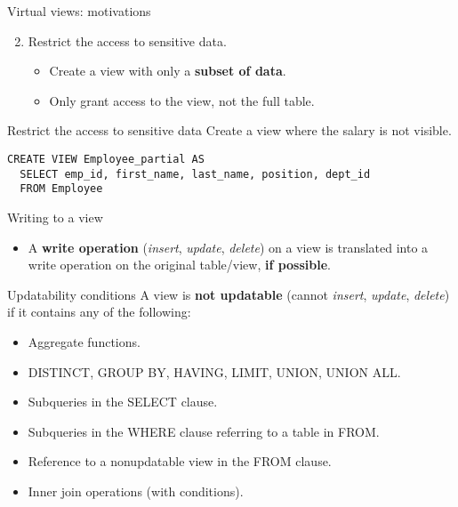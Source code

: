 \documentclass[xcolor=table]{beamer}
\begin{document}
\begin{frame}[fragile]{Virtual views: motivations}
  \begin{enumerate}
    \setcounter{enumi}{1}
    \item Restrict the access to sensitive data.
    \begin{itemize}
        \item Create a view with only a {\bf subset of data}.
        \item Only grant access to the view, not the full table.
      
    \end{itemize}
  \end{enumerate}
  \vfill
  \begin{block}{Restrict the access to sensitive data}
    Create a view where the salary is not visible.
  \footnotesize
\begin{verbatim}
CREATE VIEW Employee_partial AS
  SELECT emp_id, first_name, last_name, position, dept_id
  FROM Employee
\end{verbatim}
  \end{block}
\end{frame}

\begin{frame}{Writing to a view}
  \begin{itemize}
    \item A {\bf write operation} ({\em insert}, {\em update}, {\em delete}) on a view
    is translated into a write operation on 
    the original table/view, {\bf if possible}.
  \end{itemize}
  \vfill
  \begin{block}{Updatability conditions}
    A view is {\bf not updatable} (cannot {\em insert}, 
    {\em update}, {\em delete}) if it contains any of 
    the following:
    \begin{itemize}
      \item Aggregate functions.
      \item DISTINCT, GROUP BY, HAVING, LIMIT, UNION, UNION ALL.
      \item Subqueries in the SELECT clause.
      \item Subqueries in the WHERE clause referring to a table in FROM.
      \item Reference to a nonupdatable view in the FROM clause.
      \item Inner join operations (with conditions).
    \end{itemize}
  \end{block}
\end{frame}
\end{document}
